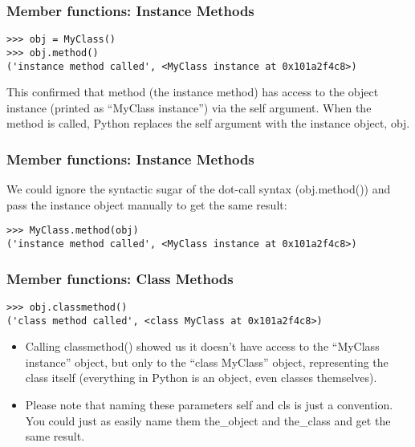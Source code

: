 \begin{frame}[fragile]\frametitle{Member functions: Instance Methods}

\begin{lstlisting}
>>> obj = MyClass()
>>> obj.method()
('instance method called', <MyClass instance at 0x101a2f4c8>)
\end{lstlisting}
This confirmed that method (the instance method) has access to the object instance (printed as ``MyClass instance'') via the self argument.
When the method is called, Python replaces the self argument with the instance object, obj. 

\end{frame}

\begin{frame}[fragile]\frametitle{Member functions: Instance Methods}

We could ignore the syntactic sugar of the dot-call syntax (obj.method()) and pass the instance object manually to get the same result:

\begin{lstlisting}
>>> MyClass.method(obj)
('instance method called', <MyClass instance at 0x101a2f4c8>)
\end{lstlisting}

\end{frame}

\begin{frame}[fragile]\frametitle{Member functions: Class Methods}

\begin{lstlisting}
>>> obj.classmethod()
('class method called', <class MyClass at 0x101a2f4c8>)
\end{lstlisting}

  \begin{itemize}
  \item Calling classmethod() showed us it doesn't have access to the ``MyClass instance'' object, but only to the ``class MyClass'' object, representing the class itself (everything in Python is an object, even classes themselves).

  \item Please note that naming these parameters self and cls is just a convention. You could just as easily name them the\_object and the\_class and get the same result. 
  \end{itemize}
  
\end{frame}

